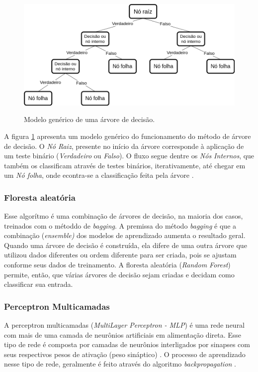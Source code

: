 \begin{figure}[ht]
\caption{Modelo genérico de uma árvore de decisão.}
\centering %
\includegraphics[width=15cm]{figuras/arvore_decisao.png}
\label{figura_arvore_decisao}
\end{figure}

A figura \ref{figura_arvore_decisao} apresenta um modelo genérico do funcionamento do método de árvore de decisão. O \textit{Nó Raiz}, presente no início da árvore corresponde à aplicação de um teste binário (\textit{Verdadeiro} ou \textit{Falso}). O fluxo segue dentre os \textit{Nós Internos}, que também os classificam através de testes binários, iterativamente, até chegar em um \textit{Nó folha}, onde econtra-se a classificação feita pela árvore \cite{russell2004inteligencia}.

\subsubsection*{Floresta aleatória}
Esse algorítmo é uma combinação de árvores de decisão, na maioria dos casos, treinados com o métoddo de \textit{bagging}. A premissa do método \textit{bagging} é que a combinação (\textit{ensemble)} dos modelos de aprendizado aumenta o resultado geral.
Quando uma árvore de decisão é construída, ela difere de uma outra árvore que utilizou dados diferentes ou ordem diferente para ser criada, pois se ajustam conforme seus dados de treinamento. A floresta aleatória (\textit{Random Forest}) permite, então, que várias árvores de decisão sejam criadas e decidam como classificar sua entrada. \cite{grus2019data}

\subsubsection*{Perceptron Multicamadas}
A perceptron multicamadas (\textit{MultiLayer Perceptron - MLP}) é uma rede neural com mais de uma camada de neurônios artificiais em alimentação direta. Esse tipo de rede é composta por camadas de neurônios interligados por sinapses com seus respectivos pesos de ativação (peso sináptico) \cite{russell2004inteligencia}.
O processo de aprendizado nesse tipo de rede, geralmente é feito através do algoritmo \textit{backpropagation} \cite{haykin2007redes}.

